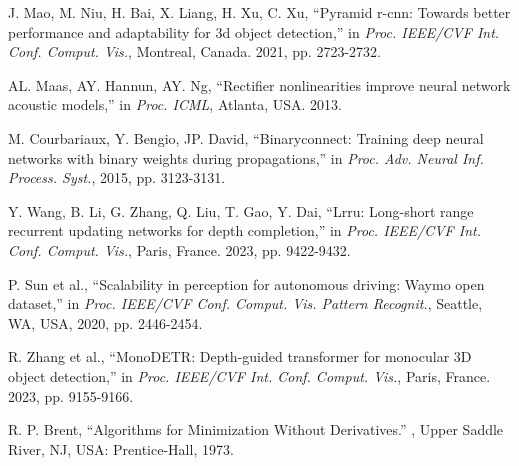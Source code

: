 \documentclass[journal]{IEEEtran}
\begin{document}
\begin{thebibliography}{1}
		J. Mao, M. Niu, H. Bai, X. Liang, H. Xu, C. Xu, “Pyramid r-cnn: Towards better performance and adaptability for 3d object detection,” in \textit{Proc. IEEE/CVF Int. Conf. Comput. Vis.}, Montreal, Canada. 2021, pp. 2723-2732. 
		
		AL. Maas, AY. Hannun, AY. Ng, “Rectifier nonlinearities improve neural network acoustic models,” in \textit{Proc. ICML}, 	Atlanta, USA. 2013. 
		
		M. Courbariaux, Y. Bengio, JP. David, “Binaryconnect: Training deep neural networks with binary weights during propagations,” in \textit{Proc. Adv. Neural Inf. Process. Syst.}, 2015, pp. 3123-3131.
		
		Y. Wang, B. Li, G. Zhang, Q. Liu, T. Gao, Y. Dai, “Lrru: Long-short range recurrent updating networks for depth completion,” in \textit{Proc. IEEE/CVF Int. Conf. Comput. Vis.}, Paris, France. 2023, pp. 9422-9432.
		
		P. Sun et al., “Scalability in perception for autonomous driving: Waymo open dataset,” in \textit{Proc. IEEE/CVF Conf. Comput. Vis. Pattern Recognit.}, Seattle, WA, USA, 2020, pp. 2446-2454.
		
		R. Zhang et al., “MonoDETR: Depth-guided transformer for monocular 3D object detection,” in \textit{Proc. IEEE/CVF Int. Conf. Comput. Vis.}, Paris, France. 2023, pp. 9155-9166.
		
		R. P. Brent, “Algorithms for Minimization Without Derivatives.” , Upper Saddle River, NJ, USA: Prentice-Hall, 1973.
		
		
		
		
	\end{thebibliography}

\end{document}
